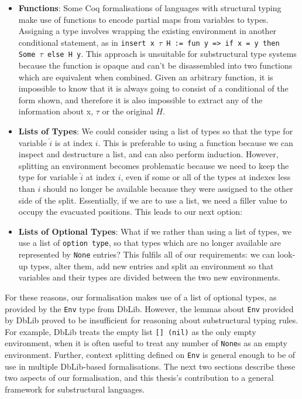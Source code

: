 \documentclass[]{unswthesis}
\let\c\texttt
\begin{document}
\begin{itemize}
\item \textbf{Functions}: Some Coq formalisations of languages with structural typing \cite{pierce15} make use of functions to encode partial maps from variables to types. Assigning a type involves wrapping the existing environment in another conditional statement, as in \c{insert x $\tau$ H := fun y => if x = y then Some $\tau$ else H y}. This approach is unsuitable for substructural type systems because the function is opaque and can't be disassembled into two functions which are equivalent when combined. Given an arbitrary function, it is impossible to know that it is always going to consist of a conditional of the form shown, and therefore it is also impossible to extract any of the information about x, $\tau$ or the original $H$.
\item \textbf{Lists of Types}: We could consider using a list of types so that the type for variable $\hat{i}$ is at index $i$. This is preferable to using a function because we can inspect and destructure a list, and can also perform induction. However, splitting an environment becomes problematic because we need to keep the type for variable $\hat{i}$ at index $i$, even if some or all of the types at indexes less than $i$ should no longer be available because they were assigned to the other side of the split. Essentially, if we are to use a list, we need a filler value to occupy the evacuated positions. This leads to our next option:
\item \textbf{Lists of Optional Types}: What if we rather than using a list of types, we use a list of \c{option type}, so that types which are no longer available are represented by \c{None} entries? This fulfils all of our requirements: we can look-up types, alter them, add new entries and split an environment so that variables and their types are divided between the two new environments.
\end{itemize}

For these reasons, our formalisation makes use of a list of optional types, as provided by the \c{Env} type from DbLib. However, the lemmas about \c{Env} provided by DbLib proved to be insufficient for reasoning about substructural typing rules. For example, DbLib treats the empty list \c{[] (nil)} as the only empty environment, when it is often useful to treat any number of \c{None}s as an empty environment. Further, context splitting defined on \c{Env} is general enough to be of use in multiple DbLib-based formalisations. The next two sections describe these two aspects of our formalisation, and this thesis's contribution to a general framework for substructural languages.
\end{document}

